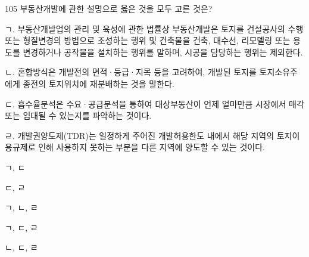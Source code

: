 \begin{question}{105}
부동산개발에 관한 설명으로 옳은 것을 모두 고른 것은?
\begin{framedtext}
ㄱ. 부동산개발업의 관리 및 육성에 관한 법률상 부동산개발은 토지를 건설공사의 수행 또는 형질변경의 방법으로 조성하는 행위 및 건축물을 건축, 대수선, 리모델링 또는 용도를 변경하거나 공작물을 설치하는 행위를 말하며, 시공을 담당하는 행위는 제외한다. \par
ㄴ. 혼합방식은 개발전의 면적·등급·지목 등을 고려하여, 개발된 토지를 토지소유주에게 종전의 토지위치에 재분배하는 것을 말한다. \par
ㄷ. 흡수율분석은 수요·공급분석을 통하여 대상부동산이 언제 얼마만큼 시장에서 매각 또는 임대될 수 있는지를 파악하는 것이다. \par
ㄹ. 개발권양도제(TDR)는 일정하게 주어진 개발허용한도 내에서 해당 지역의 토지이용규제로 인해 사용하지 못하는 부분을 다른 지역에 양도할 수 있는 것이다.
\end{framedtext}
\begin{choices}
  \item ㄱ, ㄷ
  \item ㄷ, ㄹ
  \item ㄱ, ㄴ, ㄹ
  \item ㄱ, ㄷ, ㄹ
  \item ㄴ, ㄷ, ㄹ
\end{choices}
\end{question}
